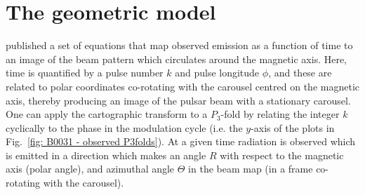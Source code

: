 \chapter[Pulsar geometry and carousel geometry]{The geometric model}
\label{app: geometry derivations}

\citet{DRxx2001} published a set of equations that map observed emission as a function of time to an image of the beam pattern which circulates around the magnetic axis. Here, time is quantified by a pulse number $k$ and pulse longitude $\phi$, and these are related to polar coordinates co-rotating with the carousel centred on the magnetic axis, thereby producing an image of the pulsar beam with a stationary carousel. One can apply the cartographic transform to a $P_3$-fold by relating the integer $k$ cyclically to the phase in the modulation cycle (i.e. the $y$-axis of the plots in Fig.~\ref{fig: B0031 - observed P3folds}). At a given time radiation is observed which is emitted in a direction which makes an angle $R$ with respect to the magnetic axis (polar angle), and azimuthal angle $\Theta$ in the beam map (in a frame co-rotating with the carousel).

